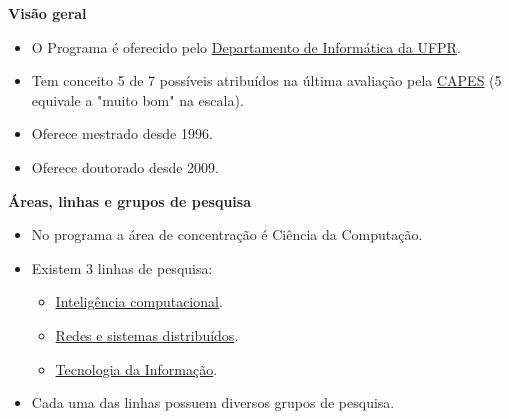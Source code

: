 \documentclass[10pt,
  aspectratio=169,
  serif,
  mathserif,
  professionalfont,
  compress,
  handout,
  ]{beamer}\usepackage[]{graphicx}\usepackage[]{color}
\begin{document}
\begin{frame}[c, allowframebreaks]
  
  \textbf{Visão geral}
  
  \begin{itemize}

  \item O Programa é oferecido pelo \href{https://web.inf.ufpr.br/dinf/}{Departamento de Informática da UFPR}. 

  \item Tem conceito 5 de 7 possíveis atribuídos na última avaliação pela \href{https://www.gov.br/capes/pt-br}{CAPES} (5 equivale a "muito bom" na escala).
  
  \item Oferece mestrado desde 1996.
  
  \item Oferece doutorado desde 2009.
  
  \end{itemize}

\end{frame}

\begin{frame}[c, allowframebreaks]
  
  \textbf{Áreas, linhas e grupos de pesquisa}
  
  \begin{itemize}

  \item No programa a área de concentração é Ciência da Computação.

  \item Existem 3 linhas de pesquisa:
  \begin{itemize}
    \item \href{http://www.prppg.ufpr.br/ppginformatica/index.php/inteligencia-computacional/?lang=pb}{Inteligência computacional}.
    \item \href{http://www.prppg.ufpr.br/ppginformatica/index.php/redes-e-sistemas-distribuidos/?lang=pb}{Redes e sistemas distribuídos}.
    \item \href{http://www.prppg.ufpr.br/ppginformatica/index.php/tecnologia-da-informacao/?lang=pb}{Tecnologia da Informação}.
  \end{itemize}
  
  \item Cada uma das linhas possuem diversos grupos de pesquisa.
  
  \end{itemize}

\end{frame}
\end{document}
